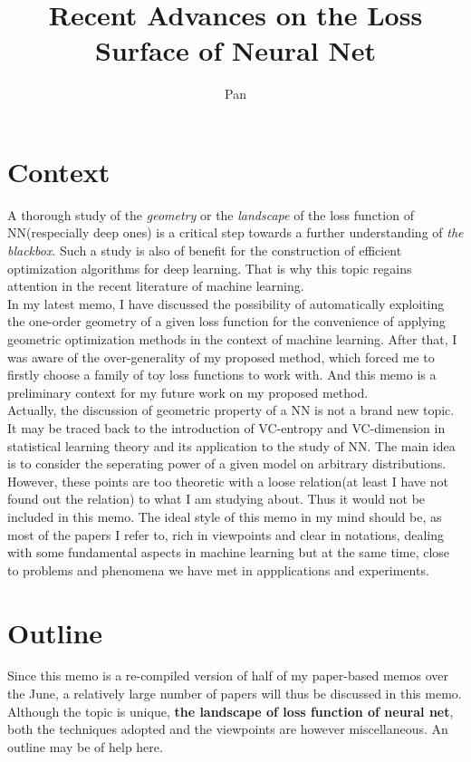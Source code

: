 \documentclass[10pt,a4paper]{article}
\author{Pan}
\title{Recent Advances on the Loss Surface of Neural Net}
\begin{document}
\maketitle
\section{Context}
A thorough study of the \textit{geometry} or the \textit{landscape} of the loss function of NN(respecially deep ones) is a critical step towards a further understanding of \textit{the blackbox}. Such a study is also of benefit for the construction of efficient optimization algorithms for deep learning. That is why this topic regains attention in the recent literature of machine learning.
\\
In my latest memo\cite{memo}, I have discussed the possibility of automatically exploiting the one-order geometry of a given loss function for the convenience of applying geometric optimization methods in the context of machine learning. After that, I was aware of the over-generality of my proposed method, which forced me to firstly choose a family of toy loss functions to work with. And this memo is a preliminary context for my future work on my proposed method.   
\\
Actually, the discussion of geometric property of a NN is not a brand new topic. It may be traced back to the introduction of VC-entropy and VC-dimension in statistical learning theory\cite{vapnik2012the} and its application to the study of NN\cite{Anthony2009}. The main idea is to consider the seperating power of a given model on arbitrary distributions. However, these points are too theoretic with a loose relation(at least I have not found out the relation) to what I am studying about. Thus it would not be included in this memo. The ideal style of this memo in my mind should be, as most of the papers I refer to, rich in viewpoints and clear in notations, dealing with some fundamental aspects in machine learning but at the same time, close to problems and phenomena we have met in appplications and experiments.
\section{Outline}
Since this memo is a re-compiled version of half of my paper-based memos over the June, a relatively large number of papers will thus be discussed in this memo. Although the topic is unique, \textbf{the landscape of loss function of neural net}, both the techniques adopted and the viewpoints are however miscellaneous. An outline may be of help here.
\end{document}

